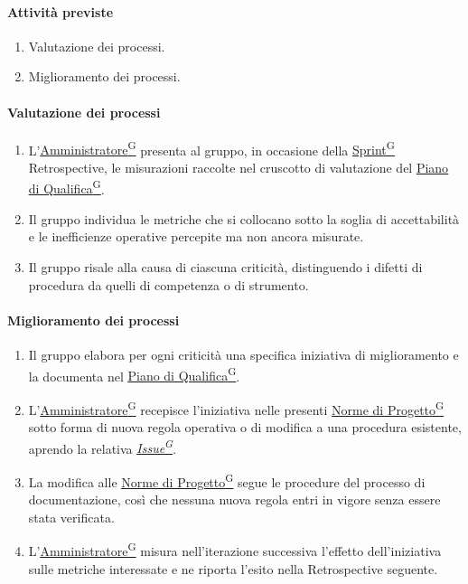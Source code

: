 \documentclass[a4paper,12pt]{article}
\providecommand{\glslink}[2]{\href{https://alittlebyte-19.github.io/Documentazione/glossario.html\#gls-#1}{\underline{#2}\textsuperscript{\scriptsize G}}}
\begin{document}
\paragraph{Attività previste}
\begin{enumerate}
    \item Valutazione dei processi.
    \item Miglioramento dei processi.
\end{enumerate}

\paragraph{Valutazione dei processi}
\begin{enumerate}
    \item L'\glslink{amministratore}{Amministratore} presenta al gruppo, in occasione della \glslink{sprint}{Sprint} Retrospective, le misurazioni raccolte nel cruscotto di valutazione del \glslink{piano-di-qualifica}{Piano di Qualifica}.
    \item Il gruppo individua le metriche che si collocano sotto la soglia di accettabilità e le inefficienze operative percepite ma non ancora misurate.
    \item Il gruppo risale alla causa di ciascuna criticità, distinguendo i difetti di procedura da quelli di competenza o di strumento.
\end{enumerate}

\paragraph{Miglioramento dei processi}
\begin{enumerate}
    \item Il gruppo elabora per ogni criticità una specifica iniziativa di miglioramento e la documenta nel \glslink{piano-di-qualifica}{Piano di Qualifica}.
    \item L'\glslink{amministratore}{Amministratore} recepisce l'iniziativa nelle presenti \glslink{norme-di-progetto}{Norme di Progetto} sotto forma di nuova regola operativa o di modifica a una procedura esistente, aprendo la relativa \textit{\glslink{issue}{Issue}}.
    \item La modifica alle \glslink{norme-di-progetto}{Norme di Progetto} segue le procedure del processo di documentazione, così che nessuna nuova regola entri in vigore senza essere stata verificata.
    \item L'\glslink{amministratore}{Amministratore} misura nell'iterazione successiva l'effetto dell'iniziativa sulle metriche interessate e ne riporta l'esito nella Retrospective seguente.
\end{enumerate}
\end{document}
